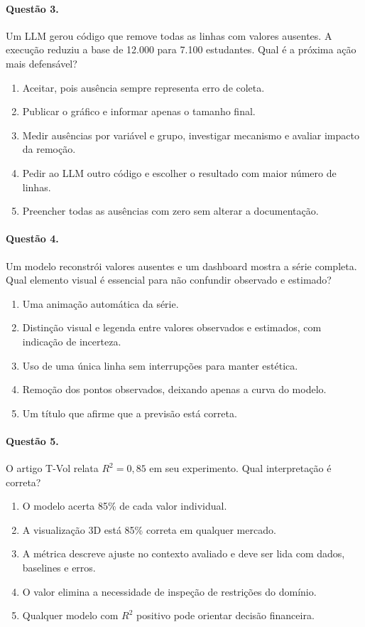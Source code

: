 \paragraph{Questão 3.} Um LLM gerou código que remove todas as linhas com valores ausentes. A execução reduziu a base de 12.000 para 7.100 estudantes. Qual é a próxima ação mais defensável?

\begin{enumerate}[label=\Alph*)]
\item Aceitar, pois ausência sempre representa erro de coleta.
\item Publicar o gráfico e informar apenas o tamanho final.
\item Medir ausências por variável e grupo, investigar mecanismo e avaliar impacto da remoção.
\item Pedir ao LLM outro código e escolher o resultado com maior número de linhas.
\item Preencher todas as ausências com zero sem alterar a documentação.
\end{enumerate}

\paragraph{Questão 4.} Um modelo reconstrói valores ausentes e um dashboard mostra a série completa. Qual elemento visual é essencial para não confundir observado e estimado?

\begin{enumerate}[label=\Alph*)]
\item Uma animação automática da série.
\item Distinção visual e legenda entre valores observados e estimados, com indicação de incerteza.
\item Uso de uma única linha sem interrupções para manter estética.
\item Remoção dos pontos observados, deixando apenas a curva do modelo.
\item Um título que afirme que a previsão está correta.
\end{enumerate}

\paragraph{Questão 5.} O artigo T-Vol relata $R^2=0{,}85$ em seu experimento. Qual interpretação é correta?

\begin{enumerate}[label=\Alph*)]
\item O modelo acerta 85\% de cada valor individual.
\item A visualização 3D está 85\% correta em qualquer mercado.
\item A métrica descreve ajuste no contexto avaliado e deve ser lida com dados, baselines e erros.
\item O valor elimina a necessidade de inspeção de restrições do domínio.
\item Qualquer modelo com $R^2$ positivo pode orientar decisão financeira.
\end{enumerate}

